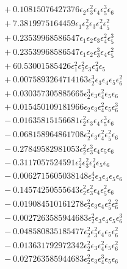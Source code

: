 \documentclass[10pt]{article}
\begin{document}
\begin{align*}
&{}  + 0.10815076427376 \epsilon_{2} \epsilon_{3}^{2} \epsilon_{4} \epsilon_{5}^{3} \epsilon_{6} \\
&{}  + 7.3819975164459 \epsilon_{1} \epsilon_{2}^{2} \epsilon_{3} \epsilon_{4}^{2} \epsilon_{5}^{2} \\
&{}  + 0.23539968586547 \epsilon_{1} \epsilon_{2} \epsilon_{3} \epsilon_{4}^{2} \epsilon_{5}^{3} \\
&{}  + 0.23539968586547 \epsilon_{1} \epsilon_{2} \epsilon_{3}^{3} \epsilon_{4} \epsilon_{5}^{2} \\
&{}  + 60.53001585426 \epsilon_{1}^{2} \epsilon_{2}^{2} \epsilon_{3} \epsilon_{4}^{2} \epsilon_{5} \\
&{}  + 0.0075893264714163 \epsilon_{2}^{3} \epsilon_{3} \epsilon_{4} \epsilon_{5} \epsilon_{6}^{2} \\
&{}  + 0.030357305885665 \epsilon_{2}^{3} \epsilon_{3} \epsilon_{4}^{2} \epsilon_{5} \epsilon_{6} \\
&{}  + 0.015450109181966 \epsilon_{2} \epsilon_{3} \epsilon_{4}^{2} \epsilon_{5} \epsilon_{6}^{3} \\
&{}  - 0.01635815156681 \epsilon_{2}^{2} \epsilon_{3} \epsilon_{4} \epsilon_{5}^{3} \epsilon_{6} \\
&{}  - 0.068158964861708 \epsilon_{2}^{2} \epsilon_{3} \epsilon_{4}^{2} \epsilon_{5}^{2} \epsilon_{6} \\
&{}  - 0.27849582981053 \epsilon_{2}^{2} \epsilon_{3}^{3} \epsilon_{4} \epsilon_{5} \epsilon_{6} \\
&{}  - 0.3117057524591 \epsilon_{2}^{2} \epsilon_{3}^{2} \epsilon_{4}^{2} \epsilon_{5} \epsilon_{6} \\
&{}  - 0.0062715605038148 \epsilon_{2}^{4} \epsilon_{3} \epsilon_{4} \epsilon_{5} \epsilon_{6} \\
&{}  - 0.14574250555643 \epsilon_{2}^{2} \epsilon_{3}^{2} \epsilon_{4} \epsilon_{5}^{2} \epsilon_{6} \\
&{}  - 0.019084510161278 \epsilon_{2}^{2} \epsilon_{3} \epsilon_{4} \epsilon_{5}^{2} \epsilon_{6}^{2} \\
&{}  - 0.0027263585944683 \epsilon_{2}^{2} \epsilon_{3} \epsilon_{4} \epsilon_{5} \epsilon_{6}^{3} \\
&{}  - 0.048580835185477 \epsilon_{2}^{2} \epsilon_{3}^{2} \epsilon_{4} \epsilon_{5} \epsilon_{6}^{2} \\
&{}  - 0.013631792972342 \epsilon_{2}^{2} \epsilon_{3} \epsilon_{4}^{2} \epsilon_{5} \epsilon_{6}^{2} \\
&{}  - 0.027263585944683 \epsilon_{2}^{2} \epsilon_{3} \epsilon_{4}^{3} \epsilon_{5} \epsilon_{6} \\

\end{align*}
\end{document}
